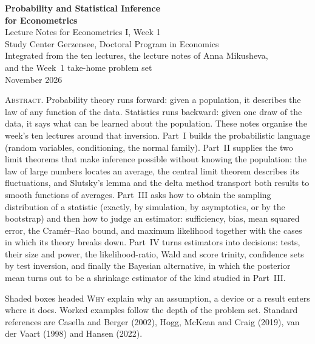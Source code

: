 \documentclass[11pt,a4paper]{article}
\begin{document}
\thispagestyle{empty}
\begin{center}
\vspace*{2.2cm}
{\LARGE\bfseries Probability and Statistical Inference}\\[6pt]
{\Large\bfseries for Econometrics}\\[1.1cm]
{\large Lecture Notes for Econometrics I, Week 1}\\[4pt]
{\large Study Center Gerzensee, Doctoral Program in Economics}\\[1.3cm]
{\normalsize Integrated from the ten lectures, the lecture notes of Anna Mikusheva,\\ and the Week~1 take-home problem set}\\[0.6cm]
{\normalsize November 2026}
\end{center}

\vspace{1.4cm}
\begin{center}
\begin{minipage}{0.84\textwidth}
\small
\noindent\textsc{Abstract.}\enspace
Probability theory runs forward: given a population, it describes the law of any function of the data. Statistics runs backward: given one draw of the data, it says what can be learned about the population. These notes organise the week's ten lectures around that inversion. Part~I builds the probabilistic language (random variables, conditioning, the normal family). Part~II supplies the two limit theorems that make inference possible without knowing the population: the law of large numbers locates an average, the central limit theorem describes its fluctuations, and Slutsky's lemma and the delta method transport both results to smooth functions of averages. Part~III asks how to obtain the sampling distribution of a statistic (exactly, by simulation, by asymptotics, or by the bootstrap) and then how to judge an estimator: sufficiency, bias, mean squared error, the Cram\'er--Rao bound, and maximum likelihood together with the cases in which its theory breaks down. Part~IV turns estimators into decisions: tests, their size and power, the likelihood-ratio, Wald and score trinity, confidence sets by test inversion, and finally the Bayesian alternative, in which the posterior mean turns out to be a shrinkage estimator of the kind studied in Part~III.

\smallskip
\noindent Shaded boxes headed \textsc{Why} explain why an assumption, a device or a result enters where it does. Worked examples follow the depth of the problem set. Standard references are Casella and Berger (2002), Hogg, McKean and Craig (2019), van der Vaart (1998) and Hansen (2022).
\end{minipage}
\end{center}
\end{document}
